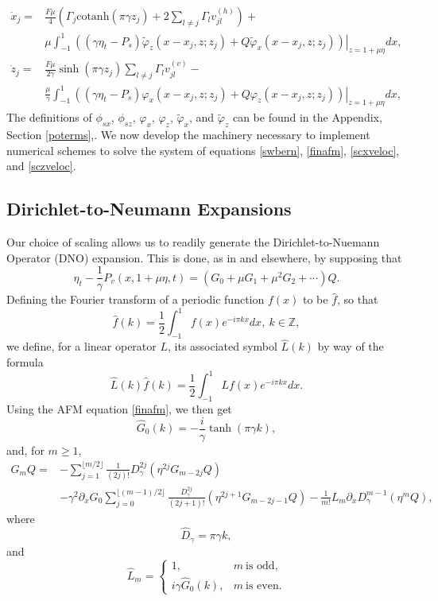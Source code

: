 \documentclass[a4paper,11pt]{article}
\newcommand{\ba}{\begin{array}}
\newcommand{\ea}{\end{array}}
\newcommand{\p}{\partial}
\begin{document}
\begin{align}
\dot{x}_{j} = &\frac{F\mu}{4}\left(\Gamma_{j}\mbox{cotanh}\left(\pi \gamma z_{j} \right)+2\sum_{l\neq j}\Gamma_{l}v_{jl}^{(h)} \right)+\label{scxveloc}\\
& \mu \int_{-1}^{1} \left.\left( \left(\gamma \eta_{t}-P_{s} \right) \tilde{\varphi}_{z}(x-x_{j},z;z_{j}) +  Q \tilde{\varphi}_{x}(x-x_{j},z;z_{j}) \right)\right|_{z=1+\mu\eta} dx, \nonumber\\
\dot{z}_{j} = & \frac{F\mu}{2\gamma}\sinh\left( \pi \gamma z_{j}\right)\sum_{l\neq j} \Gamma_{l} v_{jl}^{(v)}-\label{sczveloc}\\
&  \frac{\mu}{\gamma }\int_{-1}^{1} \left.\left(\left(\gamma \eta_{t}-P_{s}\right) \varphi_{x}(x-x_{j},z;z_{j}) + Q \varphi_{z}(x-x_{j},z;z_{j}) \right)\right|_{z=1+\mu\eta}dx, \nonumber
\end{align}
The definitions of $\phi_{sx}$, $\phi_{sz}$, $\varphi_{x}$, $\varphi_{z}$, $\tilde{\varphi}_{x}$, and $\tilde{\varphi}_{z}$ can be found in the Appendix, Section \ref{poterms},.  We now develop the machinery necessary to implement numerical schemes to solve the system of equations \eqref{swbern}, \eqref{finafm}, \eqref{scxveloc}, and \eqref{sczveloc}.  
\subsection{Dirichlet-to-Neumann Expansions}
Our choice of scaling allows us to readily generate the Dirichlet-to-Nuemann Operator (DNO) expansion.  This is done, as in \cite{craig} and elsewhere, by supposing that 
\[
\eta_{t} - \frac{1}{\gamma}P_{v}(x,1+\mu \eta,t) = \left(G_{0} + \mu G_{1} + \mu^{2}  G_{2} + \cdots \right)Q.
\]
Defining the Fourier transform of a periodic function $f(x)$ to be $\hat{f}$, so that 
\[
\hat{f}(k) = \frac{1}{2}\int_{-1}^{1}f(x)e^{-i\pi k x} dx, ~ k\in \mathbb{Z},
\]
we define, for a linear operator $L$, its associated symbol $\hat{L}(k)$ by way of the formula 
\[
\hat{L}(k)\hat{f}(k) = \frac{1}{2}\int_{-1}^{1} Lf(x) e^{-i\pi k x}dx.
\]
Using the AFM equation \eqref{finafm}, we then get 
\[
\hat{G}_{0}(k) = -\frac{i}{\gamma}\tanh(\pi \gamma k),
\]
and, for $m\geq 1$, 
\begin{align*}
G_{m}Q = & -\sum_{j=1}^{\lfloor{m/2}\rfloor}\frac{1}{(2j)!}D^{2j}_{\gamma}\left(\eta^{2j}G_{m-2j}Q\right) \\
& - \gamma^{2}\p_{x}G_{0} \sum_{j=0}^{\lfloor{(m-1)/2}\rfloor}\frac{D_{\gamma}^{2j}}{(2j+1)!}\left(\eta^{2j+1}G_{m-2j-1}Q\right) - \frac{1}{m!}L_{m} \p_{x}D_{\gamma}^{m-1}\left(\eta^{m}Q \right),
\end{align*}
where
\[
\hat{D}_{\gamma} = \pi \gamma k,
\]
and
\[
\hat{L}_{m} = \left\{
\ba{rl}
1,  & m~\mbox{is odd}, \\
i\gamma \hat{G}_{0}(k),  & m~\mbox{is even}.
\ea
\right.
\]
\end{document}
